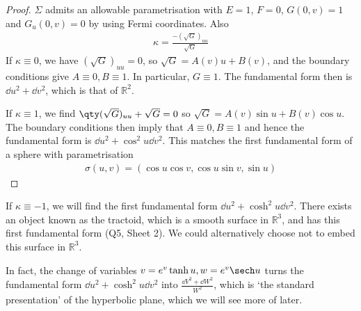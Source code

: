 \begin{proof}
	$\Sigma$ admits an allowable parametrisation with $E = 1$, $F = 0$, $G(0,v) = 1$ and $G_u(0,v) = 0$ by using Fermi coordinates.
	Also
	\begin{align*}
		\kappa = \frac{-(\sqrt{G})_{uu}}{\sqrt{G}}
	\end{align*}
	If $\kappa \equiv 0$, we have $(\sqrt{G})_{uu} = 0$, so $\sqrt{G} = A(v) u + B(v)$, and the boundary conditions give $A \equiv 0, B \equiv 1$.
	In particular, $G \equiv 1$.
	The fundamental form then is $\dd{u}^2 + \dd{v}^2$, which is that of $\mathbb R^2$.

	If $\kappa \equiv 1$, we find $\qty(\sqrt{G})_{uu} + \sqrt{G} = 0$ so $\sqrt{G} = A(v) \sin u + B(v) \cos u$.
	The boundary conditions then imply that $A \equiv 0, B \equiv 1$ and hence the fundamental form is $\dd{u}^2 + \cos^2 u \dd{v}^2$.
	This matches the first fundamental form of a sphere with parametrisation
	\begin{align*}
		\sigma(u,v) = (\cos u \cos v, \cos u \sin v, \sin u)
	\end{align*}
\end{proof}
\begin{remark}
	If $\kappa \equiv -1$, we will find the first fundamental form $\dd{u}^2 + \cosh^2 u \dd{v}^2$.
	There exists an object known as the tractoid, which is a smooth surface in $\mathbb R^3$, and has this first fundamental form (Q5, Sheet 2).
	We could alternatively choose not to embed this surface in $\mathbb R^3$.

	In fact, the change of variables $v = e^v \tanh u, w = e^v \sech u$ turns the fundamental form $\dd{u}^2 + \cosh^2 u \dd{v}^2$ into $\frac{\dd{V}^2 + \dd{W}^2}{W^2}$, which is `the standard presentation' of the hyperbolic plane, which we will see more of later.
\end{remark}
